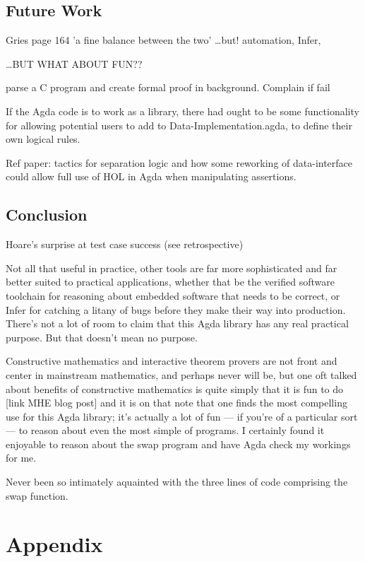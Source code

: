 \documentclass[oneside,12pt]{article}
\begin{document}
\subsection{Future Work}

Gries page 164 'a fine balance between the two' 
\ldots but! automation, Infer,

\ldots BUT WHAT ABOUT FUN??

parse a C program and create formal proof in background. Complain if fail

If the Agda code is to work as a library, there had ought to be some functionality for allowing potential users to add to Data-Implementation.agda, to define their own logical rules.


Ref paper: tactics for separation logic and how some reworking of data-interface could allow full use of HOL in Agda when manipulating assertions.


\subsection{Conclusion}

Hoare's surprise at test case success (see retrospective)

Not all that useful in practice, other tools are far more sophisticated and far better suited to practical applications, whether that be the verified software toolchain for reasoning about embedded software that needs to be correct, or Infer for catching a litany of bugs before they make their way into production. There's not a lot of room to claim that this Agda library has any real practical purpose. But that doesn't mean no purpose.

Constructive mathematics and interactive theorem provers are not front and center in mainstream mathematics, and perhaps never will be, but one oft talked about benefits of constructive mathematics is quite simply that it is fun to do [link MHE blog post] and it is on that note that one finds the most compelling use for this Agda library; it's actually a lot of fun --- if you're of a particular sort --- to reason about even the most simple of programs. I certainly found it enjoyable to reason about the swap program and have Agda check my workings for me.

Never been so intimately aquainted with the three lines of code comprising the swap function.


\section{Appendix}


\nocite{*}




 
\end{document}
